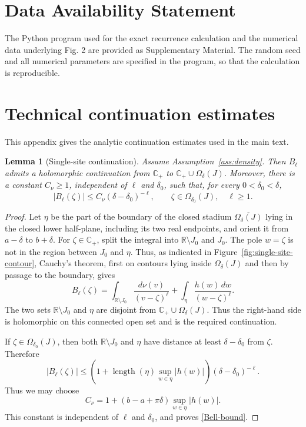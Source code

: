 \documentclass[12pt,a4paper]{article}
\numberwithin{equation}{section}
\newcommand{\R}{\mathbb R}
\newcommand{\C}{\mathbb C}
\newcommand{\Om}{\Omega}
\newcommand{\ellength}{\operatorname{length}}
\newtheorem{lem}[thm]{Lemma}
\begin{document}
\section*{Data Availability Statement}
The Python program used for the exact recurrence calculation 
and the numerical data underlying Fig. 2 are provided as Supplementary Material. 
The random seed and all numerical parameters are specified in the program, 
so that the calculation is reproducible.




\appendix
\section{Technical continuation estimates}\label{app:continuation}

This appendix gives the analytic continuation estimates used in the main
text.

\begin{lem}[Single-site continuation]\label{lem:Bell}
Assume Assumption~\ref{ass:density}.  Then $B_\ell$ admits a holomorphic
continuation from $\C_+$ to $\C_+\cup\Om_\delta(J)$.  Moreover, there is a constant $C_\nu\ge1$, independent of
$\ell$ and $\delta_0$, such that, for every $0<\delta_0<\delta$,
\begin{equation}
|B_\ell(\zeta)|
\le C_\nu(\delta-\delta_0)^{-\ell},
\qquad
\zeta\in\Om_{\delta_0}(J),\quad \ell\ge1.
\label{Bell-bound}
\end{equation}
\end{lem}

\begin{proof}
Let $\eta$ be the part of the boundary of the closed stadium
$\overline{\Om_\delta(J)}$ lying in the closed lower half-plane, including
its two real endpoints, and orient it from $a-\delta$ to $b+\delta$.
For $\zeta\in\C_+$, split the integral into $\R\setminus J_0$ and $J_0$.
The pole $w=\zeta$ is not in the region between $J_0$ and $\eta$.
Thus, as indicated in Figure~\ref{fig:single-site-contour}, Cauchy's theorem,
first on contours lying inside $\Om_\delta(J)$ and then by passage to the
boundary, gives
\begin{equation}
B_\ell(\zeta)
 =\int_{\R\setminus J_0}\frac{d\nu(v)}{(v-\zeta)^\ell}
  +\int_\eta\frac{h(w)\,d w}{(w-\zeta)^\ell}.
\label{Bell-contour}
\end{equation}
The two sets $\R\setminus J_0$ and $\eta$ are disjoint from
$\C_+\cup\Om_\delta(J)$.  Thus the right-hand side is holomorphic on this
connected open set and is the required continuation.

If $\zeta\in\Om_{\delta_0}(J)$, then both
$\R\setminus J_0$ and $\eta$ have distance at least
$\delta-\delta_0$ from $\zeta$.  Therefore
$$
|B_\ell(\zeta)|
\le
\left(1+\ellength(\eta)\sup_{w\in\eta}|h(w)|\right)
(\delta-\delta_0)^{-\ell}.
$$
Thus we may choose
\begin{equation}
 C_\nu=1+(b-a+\pi\delta)\sup_{w\in\eta}|h(w)|.
\label{Cnu-explicit}
\end{equation}
This constant is independent of $\ell$ and $\delta_0$, and proves
\eqref{Bell-bound}.
\end{proof}
\end{document}
